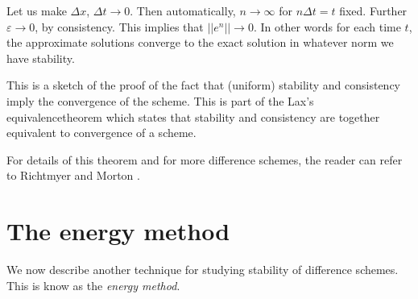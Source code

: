 Let us make $\Delta x$, $\Delta t \to 0$. Then automatically, $n \to
\infty$ for $n \Delta t = t$ fixed. Further $\varepsilon \to 0$, by
consistency. This implies that $||e^n||\to 0$. In other words for each
time $t$, the approximate solutions converge to the exact solution in
whatever norm we have stability. 

This is a sketch of the proof of the fact that (uniform) stability and
consistency imply the convergence of the scheme. This is part of the
Lax's equivalence\pageoriginale theorem which states that stability
and consistency are together equivalent to convergence of a scheme.

For details of this theorem and for more difference schemes, the
reader can refer to Richtmyer and Morton \cite{key32}.


\section{The energy method}\label{chap7:sec7.6}

We now describe another technique for studying stability of difference
schemes. This is know as the {\em energy method}.


